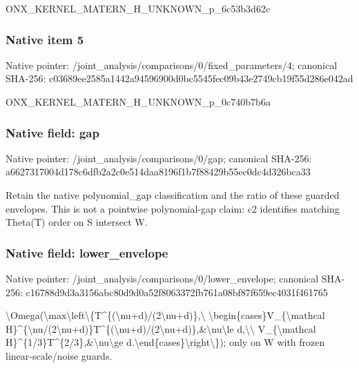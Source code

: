 \documentclass[10pt,a4paper]{article}
\begin{document}
\begingroup\raggedright\sloppy ONX\_\allowbreak{}KERNEL\_\allowbreak{}MATERN\_\allowbreak{}H\_\allowbreak{}UNKNOWN\_\allowbreak{}p\_\allowbreak{}6c53b3d62c\par\endgroup

\subsubsection{Native item 5}
Native pointer: /joint\_\allowbreak{}analysis/comparisons/0/fixed\_\allowbreak{}parameters/4; canonical SHA-256: c03689ee2585a1442a94596900d0bc5545fec09b43e2749cb19f55d286e042ad

\begingroup\raggedright\sloppy ONX\_\allowbreak{}KERNEL\_\allowbreak{}MATERN\_\allowbreak{}H\_\allowbreak{}UNKNOWN\_\allowbreak{}p\_\allowbreak{}0c740b7b6a\par\endgroup

\subsubsection{Native field: gap}
Native pointer: /joint\_\allowbreak{}analysis/comparisons/0/gap; canonical SHA-256: a6627317004d178c6dfb2a2c0e514daa8196f1b7f88429b55ec0dc4d326bca33

\begingroup\raggedright\sloppy Retain the native polynomial\_\allowbreak{}gap classification and the ratio of these guarded envelopes. This is not a pointwise polynomial-gap claim:\allowbreak{} c2 identifies matching Theta(T) order on S intersect W.\par\endgroup

\subsubsection{Native field: lower\_\allowbreak{}envelope}
Native pointer: /joint\_\allowbreak{}analysis/comparisons/0/lower\_\allowbreak{}envelope; canonical SHA-256: c16788d9d3a3156abc80d9d0a52f8063372fb761a08bf87f659ec4031f461765

\begingroup\raggedright\sloppy \textbackslash{}Omega(\textbackslash{}max\textbackslash{}left\textbackslash{}\{T\textasciicircum{}\{(\textbackslash{}nu+d)/\allowbreak{}(2\textbackslash{}nu+d)\},\allowbreak{}\textbackslash{} \textbackslash{}begin\{cases\}V\_\allowbreak{}\{\textbackslash{}mathcal H\}\textasciicircum{}\{\textbackslash{}nu/\allowbreak{}(2\textbackslash{}nu+d)\}T\textasciicircum{}\{(\textbackslash{}nu+d)/\allowbreak{}(2\textbackslash{}nu+d)\},\allowbreak{}\&\textbackslash{}nu\textbackslash{}le d,\allowbreak{}\textbackslash{}\textbackslash{} V\_\allowbreak{}\{\textbackslash{}mathcal H\}\textasciicircum{}\{1/\allowbreak{}3\}T\textasciicircum{}\{2/\allowbreak{}3\},\allowbreak{}\&\textbackslash{}nu\textbackslash{}ge d.\textbackslash{}end\{cases\}\textbackslash{}right\textbackslash{}\});\allowbreak{} only on W with frozen linear-scale/\allowbreak{}noise guards.\par\endgroup
\end{document}
